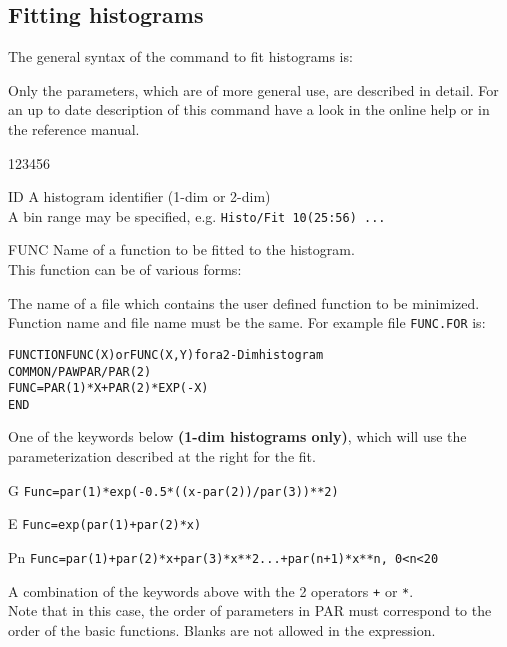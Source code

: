 \subsection{Fitting histograms}

The general syntax of the command to fit histograms is:


Only the parameters, which are of more general use, are described in detail.
For an up to date description of this command have a look in the online help or
in the reference manual.

\begin{DLtt}{123456}
\item[ID]     A histogram identifier (1-dim or 2-dim)\\
              A bin range may be specified, e.g. \texttt{Histo/Fit 10(25:56) ...}
\item[FUNC]   Name of a function to be fitted to the histogram.\\
This function can be of various forms:
\begin{OL}
\item The name of a file which contains the user defined
      function to be minimized. Function name and file name
      must be the same. For example file \texttt{FUNC.FOR} is:
\begin{alltt}
     FUNCTION FUNC(X)   or FUNC(X,Y) for a 2-Dim histogram
     COMMON/PAWPAR/PAR(2)
     FUNC=PAR(1)*X +PAR(2)*EXP(-X)
     END
\end{alltt}
\item One of the keywords below {\bf (1-dim histograms only)},
      which will use the parameterization described at the right for the fit.
\begin{DLtt}{12}
\item[G]  \texttt{Func=par(1)*exp(-0.5*((x-par(2))/par(3))**2)}
\item[E]  \texttt{Func=exp(par(1)+par(2)*x)}
\item[Pn]  \texttt{Func=par(1)+par(2)*x+par(3)*x**2...+par(n+1)*x**n, 0<n<20}
\end{DLtt}
\item A combination of the keywords above with the 2 operators \texttt{+}
      or \texttt{*}.\\[2mm]
      Note that in this case, the order of parameters in PAR must
      correspond to the order of the basic functions.
      Blanks are not allowed in the expression.
\end{OL}

\end{DLtt}
